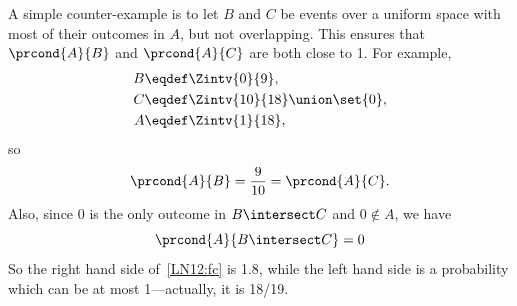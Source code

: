 A simple counter-example is to let $B$ and $C$ be events over a
uniform space with most of their outcomes in $A$, but not overlapping.
This ensures that $\prcond{A}{B}$ and $\prcond{A}{C}$ are both close
to 1.  For example,
\begin{align*}
B & \eqdef \Zintv{0}{9},\\
C & \eqdef \Zintv{10}{18} \union \set{0},\\
A & \eqdef \Zintv{1}{18},
\end{align*}
so
\[
\prcond{A}{B} = \frac{9}{10} = \prcond{A}{C}.
\]
Also, since 0 is the only outcome in $B \intersect C$ and $0 \notin
A$, we have
\[
\prcond{A}{B \intersect C} = 0
\]
So the right hand side of~\eqref{LN12:fc} is 1.8, while the left hand
side is a probability which can be at most 1---actually, it is 18/19.

\begin{problems}
\practiceproblems
{}

\classproblems
{}

\homeworkproblems
{}

\examproblems
{}
\end{problems}


